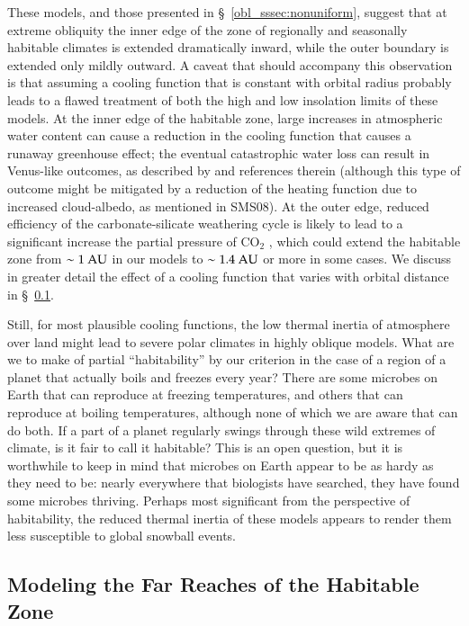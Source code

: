 These models, and those presented in \S~\ref{obl_sssec:nonuniform},
suggest that at extreme obliquity the inner edge of the zone of
regionally and seasonally habitable climates is extended dramatically
inward, while the outer boundary is extended only mildly outward.  A
caveat that should accompany this observation is that assuming a
cooling function that is constant with orbital radius probably leads
to a flawed treatment of both the high and low insolation limits of
these models.  At the inner edge of the habitable zone, large
increases in atmospheric water content can cause a reduction in the
cooling function that causes a runaway greenhouse effect; the eventual
catastrophic water loss can result in Venus-like outcomes, as
described by \citet{kasting_et_al1993} and references therein
(although this type of outcome might be mitigated by a reduction of
the heating function due to increased cloud-albedo, as mentioned in
SMS08).  At the outer edge, reduced efficiency of the
carbonate-silicate weathering cycle is likely to lead to a significant
increase the partial pressure of CO$_2$ \citep{kasting_et_al1993},
which could extend the habitable zone from $\sim 1\rm~AU$ in our
models to $\sim 1.4\rm~AU$ or more in some cases.  We discuss in
greater detail the effect of a cooling function that varies with
orbital distance in \S~\ref{obl_ssec:IWK97}.

Still, for most plausible cooling functions, the low thermal inertia
of atmosphere over land might lead to severe polar climates in highly
oblique models.  What are we to make of partial ``habitability'' by
our criterion in the case of a region of a planet that actually boils
and freezes every year?  There are some microbes on Earth that can
reproduce at freezing temperatures, and others that can reproduce at
boiling temperatures, although none of which we are aware that can do
both.  If a part of a planet regularly swings through these wild
extremes of climate, is it fair to call it habitable?  This is an open
question, but it is worthwhile to keep in mind that microbes on Earth
appear to be as hardy as they need to be: nearly everywhere that
biologists have searched, they have found some microbes thriving.
Perhaps most significant from the perspective of habitability, the
reduced thermal inertia of these models appears to render them less
susceptible to global snowball events.


\subsection{Modeling the Far Reaches of the Habitable Zone}
\label{obl_ssec:IWK97}

